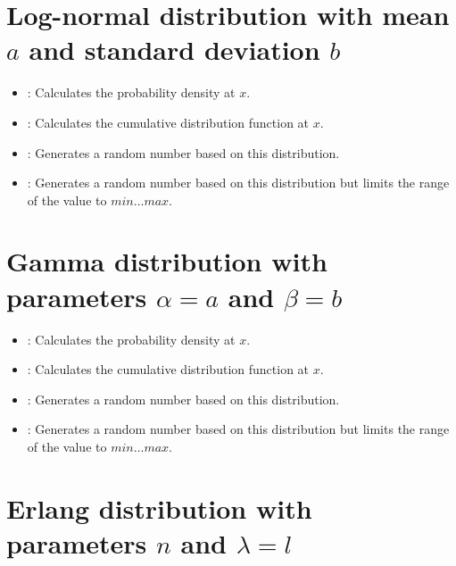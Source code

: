 \section{Log-normal distribution with mean \texorpdfstring{$a$}{a} and standard deviation \texorpdfstring{$b$}{b}}

\begin{itemize}

\item
{}:
Calculates the probability density at $x$.

\item
{}:
Calculates the cumulative distribution function at $x$.

\item
{}:
Generates a random number based on this distribution.

\item
{}:
Generates a random number based on this distribution but limits the range of the value to $min\ldots max$.

\end{itemize}



\section{Gamma distribution with parameters \texorpdfstring{$\alpha=a$}{a} and \texorpdfstring{$\beta=b$}{b}}

\begin{itemize}

\item
{}:
Calculates the probability density at $x$.

\item
{}:
Calculates the cumulative distribution function at $x$.

\item
{}:
Generates a random number based on this distribution.

\item
{}:
Generates a random number based on this distribution but limits the range of the value to $min\ldots max$.

\end{itemize}



\section{Erlang distribution with parameters \texorpdfstring{$n$}{n} and \texorpdfstring{$\lambda=l$}{l}}

